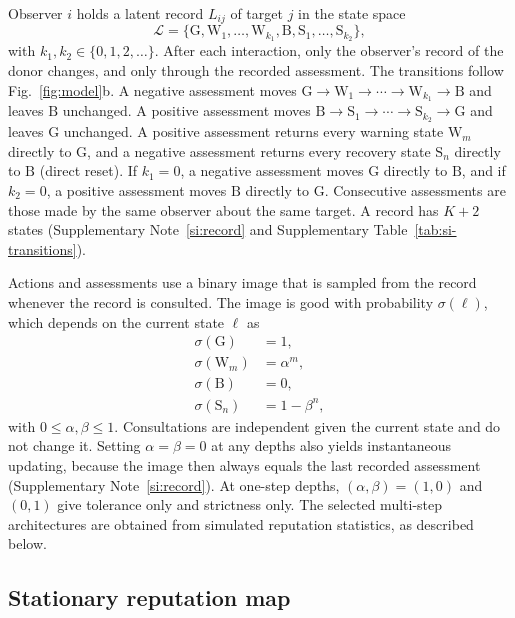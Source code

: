 \documentclass[10pt]{wlscirep}
\newcommand{\Lspace}{\mathscr{L}}          %
\newcommand{\st}[1]{\mathrm{#1}}           %
\theoremstyle{plain}
\theoremstyle{remark}
\begin{document}
Observer $i$ holds a latent record $L_{ij}$ of target $j$ in the state space
\begin{equation}
\Lspace=\{\st G,\st W_1,\ldots,\st W_{k_1},\st B,\st S_1,\ldots,\st S_{k_2}\},
\label{eq:m-states}
\end{equation}
with $k_1,k_2\in\{0,1,2,\ldots\}$. After each interaction, only the observer's record of the donor changes, and only through the recorded assessment. The transitions follow Fig.~\ref{fig:model}b. A negative assessment moves $\st G\to\st W_1\to\cdots\to\st W_{k_1}\to\st B$ and leaves $\st B$ unchanged. A positive assessment moves $\st B\to\st S_1\to\cdots\to\st S_{k_2}\to\st G$ and leaves $\st G$ unchanged. A positive assessment returns every warning state $\st W_m$ directly to $\st G$, and a negative assessment returns every recovery state $\st S_n$ directly to $\st B$ (direct reset). If $k_1=0$, a negative assessment moves $\st G$ directly to $\st B$, and if $k_2=0$, a positive assessment moves $\st B$ directly to $\st G$. Consecutive assessments are those made by the same observer about the same target. A record has $K+2$ states (Supplementary Note~\ref{si:record} and Supplementary Table~\ref{tab:si-transitions}).

Actions and assessments use a binary image that is sampled from the record whenever the record is consulted. The image is good with probability $\sigma(\ell)$, which depends on the current state $\ell$ as
\begin{equation}
\begin{aligned}
\sigma(\st G)&=1,\\
\sigma(\st W_m)&=\alpha^m,\\
\sigma(\st B)&=0,\\
\sigma(\st S_n)&=1-\beta^n,
\end{aligned}
\label{eq:m-readout}
\end{equation}
with $0\leq\alpha,\beta\leq1$. Consultations are independent given the current state and do not change it. Setting $\alpha=\beta=0$ at any depths also yields instantaneous updating, because the image then always equals the last recorded assessment (Supplementary Note~\ref{si:record}). At one-step depths, $(\alpha,\beta)=(1,0)$ and $(0,1)$ give tolerance only and strictness only. The selected multi-step architectures are obtained from simulated reputation statistics, as described below.

\subsection*{Stationary reputation map}
\end{document}
